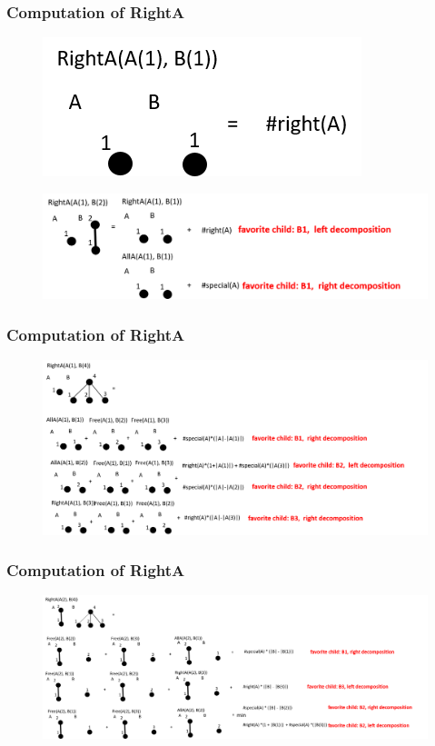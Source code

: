 \documentclass{beamer}
\begin{document}
\begin{frame}
\frametitle{Computation of RightA}
\begin{figure}
	\includegraphics[width=0.4\linewidth]{RightA_1_1}
	\label{RightA_1_1} 
	\centering
\end{figure}
\begin{figure}
	\includegraphics[width=1.1\linewidth]{RightA_1_2}
	\label{RightA_1_2} 
	\centering
\end{figure}

\end{frame}

\begin{frame}
\frametitle{Computation of RightA}
\begin{figure}
	\includegraphics[width=1.0\linewidth]{RightA_1_4}
	\label{RightA_1_4} 
	\centering
\end{figure}

\end{frame}

\begin{frame}
\frametitle{Computation of RightA}
\begin{figure}
	\includegraphics[width=1.0\linewidth]{RightA_2_4}
	\label{RightA_2_4} 
	\centering
\end{figure}

\end{frame}
\end{document}
